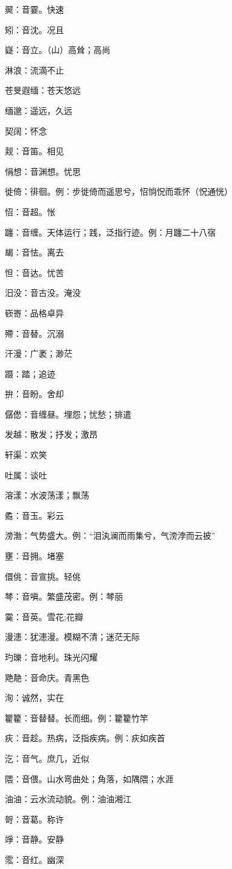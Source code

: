 翜：音霎。快速

矧：音沈。况且

嶷：音立。（山）高耸；高尚

淋浪：流滴不止

苍旻遐缅：苍天悠远

缅邈：遥远，久远

契阔：怀念

觌：音笛。相见

悁想：音渊想。忧思

徙倚：徘徊。例：步徙倚而遥思兮，怊惝怳而乖怀（怳通恍）

怊：音超。怅

躔：音缠。天体运行；践，泛指行迹。例：月躔二十八宿

朅：音怯。离去

怛：音达。忧苦

汨没：音古没。淹没

嵚㟢：品格卓异

殢：音替。沉溺

汗漫：广袤；渺茫

蹑：踏；追迹

拚：音盼。舍却

僝僽：音缠昼。埋怨；忧愁；排遣

发越：散发；抒发；激昂

轩渠：欢笑

吐属：谈吐

溶漾：水波荡漾；飘荡

矞：音玉。彩云

滂渤：气势盛大。例：“泪汍澜而雨集兮，气滂浡而云披”

壅：音拥。堵塞

儇佻：音宣挑。轻佻

棽：音嗔。繁盛茂密。例：棽丽

霙：音英。雪花;花瓣

漫漶：犹漶漫。模糊不清；迷茫无际

玓瓅：音地利。珠光闪耀

䒌靘：音命庆。青黑色

洵：诚然，实在

籊籊：音替替。长而细。例：籊籊竹竿

疢：音趁。热病，泛指疾病。例：疢如疾首

汔：音气。庶几，近似

隈：音偎。山水弯曲处；角落，如隅隈；水涯

油油：云水流动貌。例：油油湘江

哿：音葛。称许

竫：音静。安静

霐：音红。幽深
\newpage